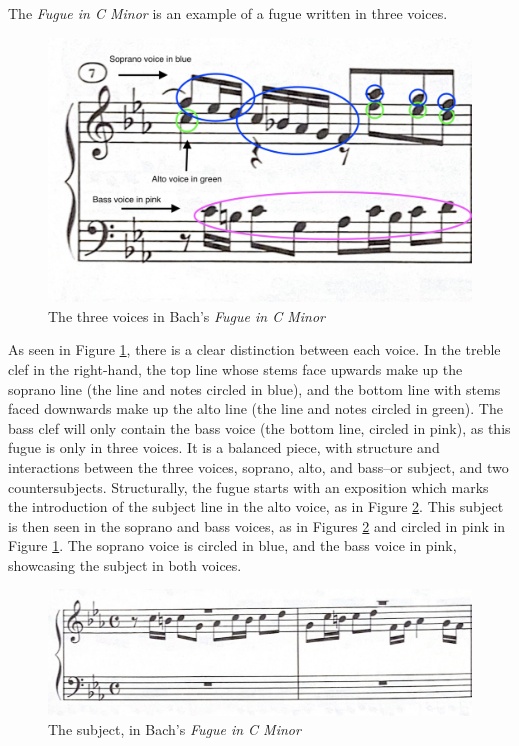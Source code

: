The \textit{Fugue in C Minor} is an example of a fugue written in three voices.
\begin{figure}
    \centering
    \includegraphics[width=.5\textwidth]{figures/fugue-three-voices.jpg}
    \caption{The three voices in Bach's \textit{Fugue in C Minor}}
    \label{fig:bach-fugue-three-voices}
\end{figure}
As seen in Figure \ref{fig:bach-fugue-three-voices}\autocite{Henle_2009}, there is a clear distinction between each voice. In the treble clef in the right-hand, the top line whose stems face upwards make up the soprano line (the line and notes circled in blue), and the bottom line with stems faced downwards make up the alto line (the line and notes circled in green). The bass clef will only contain the bass voice (the bottom line, circled in pink), as this fugue is only in three voices. It is a balanced piece, with structure and interactions between the three voices, soprano, alto, and bass--or subject, and two countersubjects. Structurally, the fugue starts with an exposition which marks the introduction of the subject line in the alto voice, as in Figure \ref{fig:bach-fugue-subject}\autocite{Henle_2009}. This subject is then seen in the soprano and bass voices, as in Figures \ref{fig:bach-fugue-subject}\autocite{Henle_2009} and circled in pink in Figure \ref{fig:bach-fugue-three-voices}\autocite{Henle_2009}. The soprano voice is circled in blue, and the bass voice in pink, showcasing the subject in both voices.
\begin{figure}
    \centering
    \includegraphics[width=\textwidth]{figures/bach-fugue-subject.jpg}
    \caption{The subject, in Bach's \textit{Fugue in C Minor}}
    \label{fig:bach-fugue-subject}
\end{figure}

